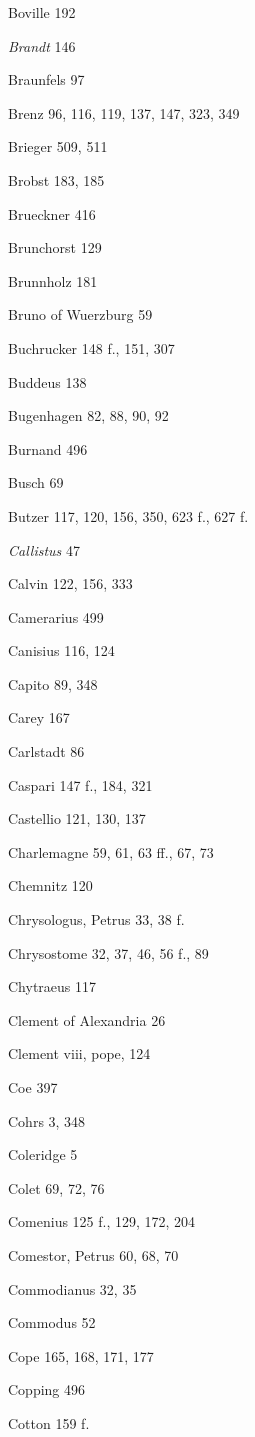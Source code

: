 Boville 192

\emph{Brandt} 146

Braunfels 97

Brenz 96, 116, 119, 137, 147, 323, 349

Brieger 509, 511

Brobst 183, 185

Brueckner 416

Brunchorst 129

Brunnholz 181

Bruno of Wuerzburg 59

Buchrucker 148 f., 151, 307

Buddeus 138

Bugenhagen 82, 88, 90, 92

Burnand 496

Busch 69

Butzer 117, 120, 156, 350, 623 f., 627 f.

\emph{Callistus} 47

Calvin 122, 156, 333

Camerarius 499

Canisius 116, 124

Capito 89, 348

Carey 167

Carlstadt 86

Caspari 147 f., 184, 321

Castellio 121, 130, 137

Charlemagne 59, 61, 63 ff., 67, 73

Chemnitz 120

Chrysologus, Petrus 33, 38 f.

Chrysostome 32, 37, 46, 56 f., 89

Chytraeus 117

Clement of Alexandria 26

Clement viii, pope, 124

Coe 397

Cohrs 3, 348

Coleridge 5

Colet 69, 72, 76

Comenius 125 f., 129, 172, 204

Comestor, Petrus 60, 68, 70

Commodianus 32, 35

Commodus 52

Cope 165, 168, 171, 177

Copping 496

Cotton 159 f.

